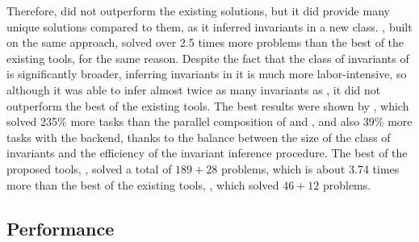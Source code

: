 
Therefore, \ringen{\cvc{}} did not outperform the existing solutions, but it did provide many unique solutions compared to them, as it inferred invariants in a new class. \ringen{\vampire{}}, built on the same approach, solved over 2.5 times more problems than the best of the existing tools, for the same reason. Despite the fact that the class of invariants of \ringenSync{} is significantly broader, inferring invariants in it is much more labor-intensive, so although it was able to infer almost twice as many invariants as \ringen{\cvc{}}, it did not outperform the best of the existing tools. The best results were shown by \ringenCICI{\cvc{}}, which solved 235\% more tasks than the parallel composition of \racer{} and \ringen{\cvc{}}, and also 39\% more tasks with the \vampire{} backend, thanks to the balance between the size of the class of invariants and the efficiency of the invariant inference procedure. The best of the proposed tools, \ringenCICI{\vampire{}}, solved a total of $189+28$ problems, which is about 3.74 times more than the best of the existing tools, \eldarica{}, which solved $46+12$ problems.

\subsection{Performance}\label{sec:evaluation/performance}

\toolplotOne{}


